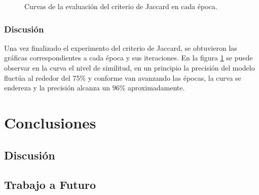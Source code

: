 \begin{figure}[ht]
    \caption{Curvas de la evaluación del criterio de Jaccard en cada época.}
    \label{fig:iou_epochs}
\end{figure}

\subsection{Discusión}
Una vez finalizado el experimento del criterio de Jaccard, se obtuvieron las gráficas correspondientes a cada época y sus iteraciones. En la figura \ref{fig:iou_epochs} se puede observar en la curva el nivel de similitud, en un principio la precisión del modelo fluctúa al rededor del 75\% y conforme van avanzando las épocas, la curva se endereza y la precisión alcanza un 96\% aproximadamente.

\chapter{Conclusiones}
\section{Discusión}

\section{Trabajo a Futuro}

\nocite{*}